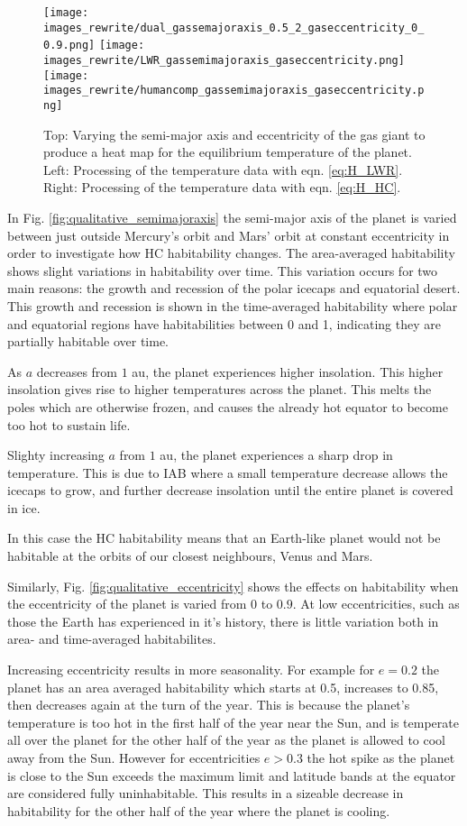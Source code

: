 \documentclass[12pt, onecolumn]{revtex4-2}    %
\begin{document}
\begin{figure}[t]
  \texttt{[image: images\_rewrite/dual\_gassemajoraxis\_0.5\_2\_gaseccentricity\_0\_0.9.png]}
  \texttt{[image: images\_rewrite/LWR\_gassemimajoraxis\_gaseccentricity.png]}
  \texttt{[image: images\_rewrite/humancomp\_gassemimajoraxis\_gaseccentricity.png]}
  \caption{
    Top: Varying the semi-major axis and eccentricity of the gas giant to produce a heat map for the equilibrium temperature of the planet.
    Left: Processing of the temperature data with eqn. \eqref{eq:H_LWR}.
    Right: Processing of the temperature data with eqn. \eqref{eq:H_HC}.
  }
  \label{fig:qualitative_semimajoraxis_eccentricity}
\end{figure}

In Fig. \ref{fig:qualitative_semimajoraxis} the semi-major axis of the planet is varied between just outside Mercury's orbit and Mars' orbit at constant eccentricity in order to investigate how HC habitability changes.
The area-averaged habitability shows slight variations in habitability over time.
This variation occurs for two main reasons: the growth and recession of the polar icecaps and equatorial desert.
This growth and recession is shown in the time-averaged habitability where polar and equatorial regions have habitabilities between 0 and 1, indicating they are partially habitable over time.

As $a$ decreases from $1$ au, the planet experiences higher insolation.
This higher insolation gives rise to higher temperatures across the planet.
This melts the poles which are otherwise frozen, and causes the already hot equator to become too hot to sustain life.

Slighty increasing $a$ from $1$ au, the planet experiences a sharp drop in temperature.
This is due to IAB where a small temperature decrease allows the icecaps to grow, and further decrease insolation until the entire planet is covered in ice.

In this case the HC habitability means that an Earth-like planet would not be habitable at the orbits of our closest neighbours, Venus and Mars.


Similarly, Fig. \ref{fig:qualitative_eccentricity} shows the effects on habitability when the eccentricity of the planet is varied from $0$ to $0.9$.
At low eccentricities, such as those the Earth has experienced in it's history, there is little variation both in area- and time-averaged habitabilites.

Increasing eccentricity results in more seasonality.
For example for $e=0.2$ the planet has an area averaged habitability which starts at 0.5, increases to 0.85, then decreases again at the turn of the year.
This is because the planet's temperature is too hot in the first half of the year near the Sun, and is temperate all over the planet for the other half of the year as the planet is allowed to cool away from the Sun.
However for eccentricities $e>0.3$ the hot spike as the planet is close to the Sun exceeds the maximum limit and latitude bands at the equator are considered fully uninhabitable.
This results in a sizeable decrease in habitability for the other half of the year where the planet is cooling.
\end{document}
